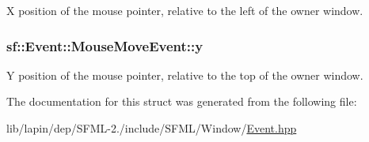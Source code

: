 X position of the mouse pointer, relative to the left of the owner window. 

\hypertarget{structsf_1_1_event_1_1_mouse_move_event_a86d78a2fba5b3abda16ca059f2392ad4}{
\subsubsection[{y}]{ sf\-::\-Event\-::\-Mouse\-Move\-Event\-::y}}\label{structsf_1_1_event_1_1_mouse_move_event_a86d78a2fba5b3abda16ca059f2392ad4}


Y position of the mouse pointer, relative to the top of the owner window. 



The documentation for this struct was generated from the following file\-:\begin{DoxyCompactItemize}
\item 
lib/lapin/dep/\-S\-F\-M\-L-\/2./include/\-S\-F\-M\-L/\-Window/\hyperlink{lib_2lapin_2dep_2_s_f_m_l-2_83_2include_2_s_f_m_l_2_window_2_event_8hpp}{Event.\-hpp}\end{DoxyCompactItemize}
